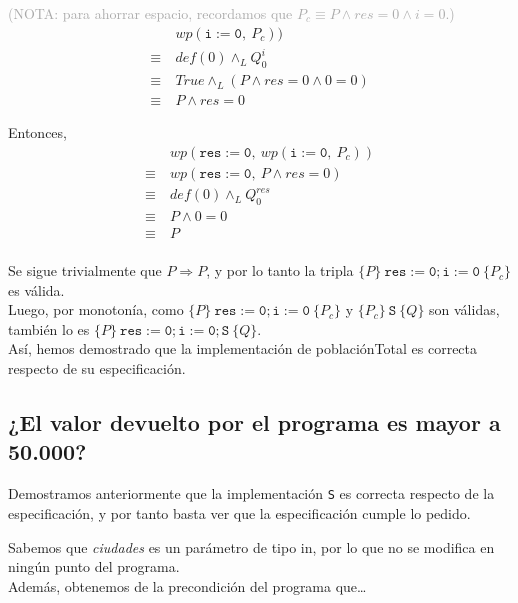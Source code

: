 \documentclass[10pt,a4paper]{article}
\begin{document}
\textcolor{darkgray}{(\textsc{NOTA}: para ahorrar espacio, recordamos que $P_c \equiv P \land res = 0 \land i = 0$.)}\\
\begin{equation*}
    \begin{split}
    & wp(\mathtt{i := 0}, \ P_c)) \\
    \equiv \ & def(0) \land_L Q_{0}^{i} \\
    \equiv \ & True \land_L (P \land res = 0 \land 0 = 0) \\
    \equiv \ & P \land res = 0
    \end{split}
\end{equation*}

Entonces, \\
\begin{equation*}
    \begin{split}
    & wp(\mathtt{res := 0}, \ wp(\mathtt{i := 0}, \ P_c)) \\
    \equiv \ & wp(\mathtt{res := 0}, \ P \land res = 0) \\
    \equiv \ & def(0) \land_L Q_{0}^{res} \\
    \equiv \ & P \land 0 = 0 \\
    \equiv \ & P \\
    \end{split}
\end{equation*}

Se sigue trivialmente que $P \Rightarrow P$, y por lo tanto la tripla $\{P\} \ \mathtt{res := 0; i := 0} \ \{P_c\}$ es válida. \\
Luego, por monotonía, como $\{P\} \ \mathtt{res := 0; i := 0} \ \{P_c\}$ y $\{P_c\} \ \mathtt{S} \ \{Q\}$ son válidas, también lo es $\{P\} \ \mathtt{res := 0; i := 0; S} \ \{Q\}$. \\
Así, hemos demostrado que la implementación de \textsf{poblaciónTotal} es correcta respecto de su especificación.

\newpage

\subsection{¿El valor devuelto por el programa es mayor a 50.000?}

Demostramos anteriormente que la implementación \texttt{S} es correcta respecto de la especificación, y por tanto basta ver que la especificación cumple lo pedido.

Sabemos  que \textit{ciudades} es un parámetro de tipo \textsf{in}, por lo que no se modifica en ningún punto del programa. \\
Además, obtenemos de la precondición del programa que\ldots
\end{document}
